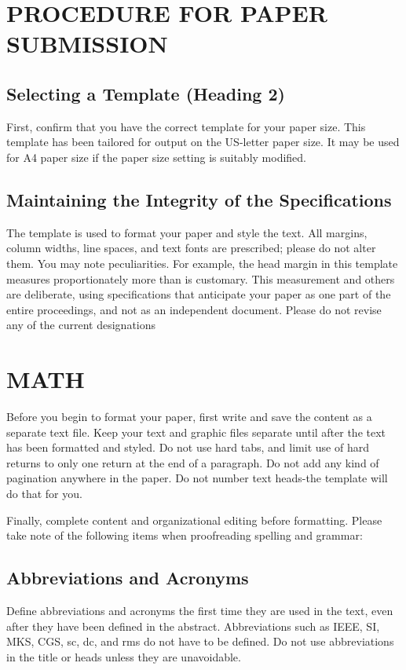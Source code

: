 \documentclass[letterpaper, 10 pt, conference]{ieeeconf}  %
\begin{document}
\section{PROCEDURE FOR PAPER SUBMISSION}

\subsection{Selecting a Template (Heading 2)}

First, confirm that you have the correct template for your paper size. This template has been tailored for output on the US-letter paper size. 
It may be used for A4 paper size if the paper size setting is suitably modified.

\subsection{Maintaining the Integrity of the Specifications}

The template is used to format your paper and style the text. All margins, column widths, line spaces, and text fonts are prescribed; please do not alter them. You may note peculiarities. For example, the head margin in this template measures proportionately more than is customary. This measurement and others are deliberate, using specifications that anticipate your paper as one part of the entire proceedings, and not as an independent document. Please do not revise any of the current designations

\section{MATH}

Before you begin to format your paper, first write and save the content as a separate text file. Keep your text and graphic files separate until after the text has been formatted and styled. Do not use hard tabs, and limit use of hard returns to only one return at the end of a paragraph. Do not add any kind of pagination anywhere in the paper. Do not number text heads-the template will do that for you.

Finally, complete content and organizational editing before formatting. Please take note of the following items when proofreading spelling and grammar:

\subsection{Abbreviations and Acronyms} Define abbreviations and acronyms the first time they are used in the text, even after they have been defined in the abstract. Abbreviations such as IEEE, SI, MKS, CGS, sc, dc, and rms do not have to be defined. Do not use abbreviations in the title or heads unless they are unavoidable.
\end{document}
